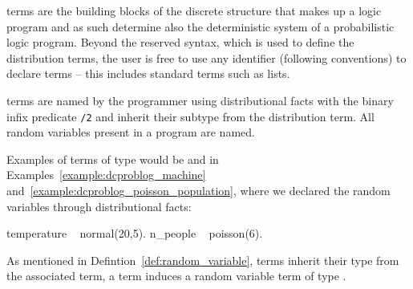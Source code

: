 

 terms are the building blocks of the discrete structure that makes up a logic program and as such determine also the deterministic system of a probabilistic logic program. Beyond the reserved syntax, which is used to define the distribution terms, the user is free to use any identifier (following \prologsty conventions) to declare  terms -- this includes standard \prologsty terms such as lists.



\begin{definition} \label{def:random_variable}
	 terms are named by the programmer using distributional facts with the binary infix predicate \probloginline{~}\lstinline[columns=fixed]|/2| and inherit their subtype from the distribution term. All random variables present in a \dcproblogsty program are named.
\end{definition}

Examples of terms of type  would be  and  in Examples~\ref{example:dcproblog_machine} and~\ref{example:dcproblog_poisson_population}, where we declared the random variables through distributional facts: 
\begin{problog}
temperature ~ normal(20,5).
n_people ~ poisson(6).
\end{problog}
As mentioned in Defintion~\ref{def:random_variable},  terms inherit their type from the associated  term, \eg a  term induces a random variable term of type .

